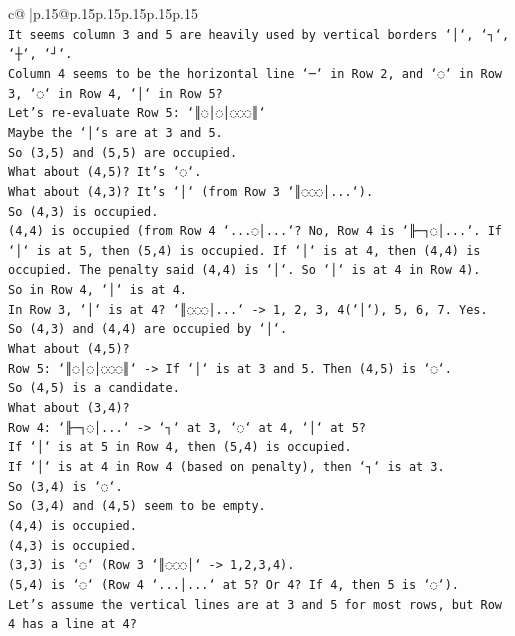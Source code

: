 \documentclass{article}
\begin{document}
{\begin{supertabular}{c@{$\;$}|p{.15\linewidth}@{}p{.15\linewidth}p{.15\linewidth}p{.15\linewidth}p{.15\linewidth}p{.15\linewidth}}
{{{\\ 
\texttt{It seems column 3 and 5 are heavily used by vertical borders `│`, `┐`, `┼`, `┘`.} \\
\texttt{Column 4 seems to be the horizontal line `─` in Row 2, and `◌` in Row 3, `◌` in Row 4, `│` in Row 5?} \\
\texttt{Let's re{-}evaluate Row 5: `║◌│◌│◌◌◌║`} \\
\texttt{Maybe the `│`s are at 3 and 5.} \\
\texttt{So (3,5) and (5,5) are occupied.} \\
\texttt{What about (4,5)? It's `◌`.} \\
\texttt{What about (4,3)? It's `│` (from Row 3 `║◌◌◌│...`).} \\
\texttt{So (4,3) is occupied.} \\
\texttt{(4,4) is occupied (from Row 4 `...◌│...`? No, Row 4 is `╟─┐◌│...`. If `│` is at 5, then (5,4) is occupied. If `│` is at 4, then (4,4) is occupied. The penalty said (4,4) is `│`. So `│` is at 4 in Row 4).} \\
\texttt{So in Row 4, `│` is at 4.} \\
\texttt{In Row 3, `│` is at 4? `║◌◌◌│...` {-}> 1, 2, 3, 4(`│`), 5, 6, 7. Yes.} \\
\texttt{So (4,3) and (4,4) are occupied by `│`.} \\
\texttt{What about (4,5)?} \\
\texttt{Row 5: `║◌│◌│◌◌◌║` {-}> If `│` is at 3 and 5. Then (4,5) is `◌`.} \\
\texttt{So (4,5) is a candidate.} \\
\texttt{What about (3,4)?} \\
\texttt{Row 4: `╟─┐◌│...` {-}> `┐` at 3, `◌` at 4, `│` at 5?} \\
\texttt{If `│` is at 5 in Row 4, then (5,4) is occupied.} \\
\texttt{If `│` is at 4 in Row 4 (based on penalty), then `┐` is at 3.} \\
\texttt{So (3,4) is `◌`.} \\
\texttt{So (3,4) and (4,5) seem to be empty.} \\
\texttt{(4,4) is occupied.} \\
\texttt{(4,3) is occupied.} \\
\texttt{(3,3) is `◌` (Row 3 `║◌◌◌│` {-}> 1,2,3,4).} \\
\texttt{(5,4) is `◌` (Row 4 `...│...` at 5? Or 4? If 4, then 5 is `◌`).} \\
\texttt{Let's assume the vertical lines are at 3 and 5 for most rows, but Row 4 has a line at 4?} \\
}}}
\end{supertabular}}
\end{document}
